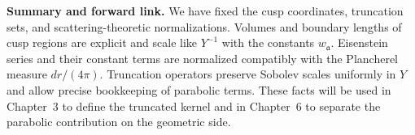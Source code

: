 \medskip
\noindent\textbf{Summary and forward link.}
We have fixed the cusp coordinates, truncation sets, and scattering-theoretic normalizations.
Volumes and boundary lengths of cusp regions are explicit and scale like $Y^{-1}$ with the constants $w_{\mathfrak{a}}$.
Eisenstein series and their constant terms are normalized compatibly with the Plancherel measure $dr/(4\pi)$.
Truncation operators preserve Sobolev scales uniformly in $Y$ and allow precise bookkeeping of parabolic terms.
These facts will be used in Chapter~3 to define the truncated kernel and in Chapter~6 to separate the parabolic contribution on the geometric side.
